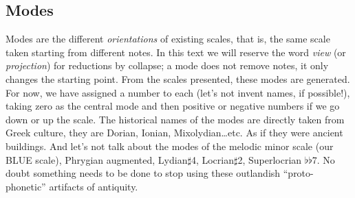 \documentclass[]{report}
\begin{document}
\subsection{Modes}
Modes are the different \emph{orientations} of existing scales, that is, the same scale taken starting from different notes. In this text we will reserve the word \emph{view} (or \emph{projection}) for reductions by collapse; a mode does not remove notes, it only changes the starting point.
From the scales presented, these modes are generated. For now, we have assigned a number to each (let's not invent names, if possible!), taking zero as the central mode and then positive or negative numbers if we go down or up the scale.
The historical names of the modes are directly taken from Greek culture, they are \textsf{Dorian}, \textsf{Ionian}, \textsf{Mixolydian}\ldots etc. As if they were ancient buildings. And let's not talk about the modes of the melodic minor scale (our \textsf{BLUE} scale), \textsf{Phrygian augmented}, \textsf{Lydian$\sharp$4}, \textsf{Locrian$\sharp$2}, \textsf{Superlocrian $\flat$$\flat$7}. No doubt something needs to be done to stop using these outlandish ``proto-phonetic'' artifacts of antiquity.
\end{document}
